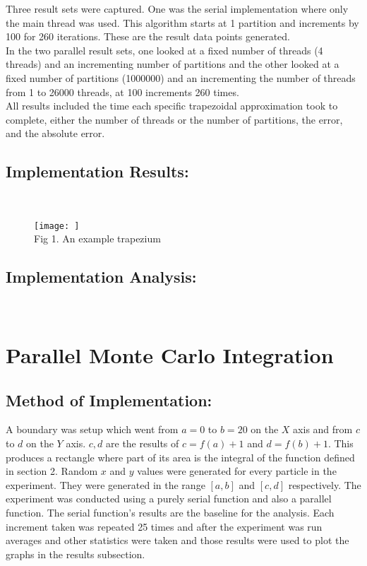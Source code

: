 \documentclass[11pt]{article}
\begin{document}
\begin{page}
\noindent Three result sets were captured. One was the serial implementation where only the main thread was used. This algorithm starts at 1 partition and increments by 100 for 260 iterations. These are the result data points generated.\\

\noindent In the two parallel result sets, one looked at a fixed number of threads (4 threads) and an incrementing number of partitions and the other looked at a fixed number of partitions (1000000) and an incrementing the number of threads from 1 to 26000 threads, at 100 increments 260 times.\\

\noindent All results included the time each specific trapezoidal approximation took to complete, either the number of threads or the number of partitions, the error, and the absolute error.

\subsection{Implementation Results:}\\
\begin{figure}[ht]
\centering
     \texttt{[image: ]}\\
     Fig 1. An example trapezium
\end{figure}

\subsection{Implementation Analysis:}\\

\section{Parallel Monte Carlo Integration}
\subsection{Method of Implementation:}
\noindent A boundary was setup which went from $a = 0$ to $b = 20$ on the $X$ axis and from $c$ to $d$ on the $Y$ axis. $c,d$ are the results of $c = f(a) + 1$ and $d = f(b) + 1$. This produces a rectangle where part of its area is the integral of the function defined in section 2. Random $x$ and $y$ values were generated for every particle in the experiment. They were generated in the range $[a,b]$ and $[c,d]$ respectively. The experiment was conducted using a purely serial function and also a parallel function. The serial function's results are the baseline for the analysis. Each increment taken was repeated 25 times and after the experiment was run averages and other statistics were taken and those results were used to plot the graphs in the results subsection.\\


\end{page}
\end{document}
